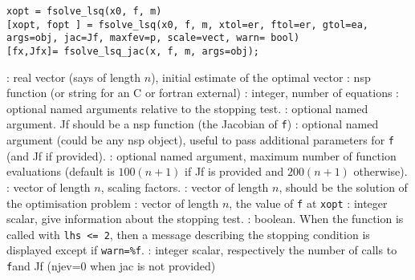 
\begin{mandesc}
\end{mandesc}

\begin{calling_sequence}
\begin{verbatim}
xopt = fsolve_lsq(x0, f, m)
[xopt, fopt ] = fsolve_lsq(x0, f, m, xtol=er, ftol=er, gtol=ea, args=obj, jac=Jf, maxfev=p, scale=vect, warn= bool) 
[fx,Jfx]= fsolve_lsq_jac(x, f, m, args=obj);
\end{verbatim}
\end{calling_sequence}
\begin{parameters}
  \begin{varlist}
    : real vector (says of length $n$), initial estimate of the optimal vector
    : nsp function (or string for an C or fortran external)
    : integer, number of equations
    : optional named arguments relative to the stopping test.
    : optional named argument. Jf should be a nsp function (the Jacobian of \verb+f+)
    : optional named argument (could be any nsp object), useful to pass additional parameters for \verb+f+ (and
    Jf if provided).
    : optional named argument, maximum number of function evaluations (default is $100(n+1)$ if Jf is
    provided and $200(n+1)$ otherwise).
    : vector of length $n$, scaling factors.
    : vector of length $n$, should be the solution of the optimisation problem 
    : vector of length $n$, the value of \verb+f+  at \verb+xopt+
    : integer scalar, give information about the stopping test.
    : boolean. When the function is called with \verb+lhs <= 2+, then a message describing the 
    stopping condition is displayed except if \verb+warn=%f+.
    : integer scalar, respectively the number of calls to \verb+f+and Jf (njev=0 when jac is not provided)
  \end{varlist}
\end{parameters}

